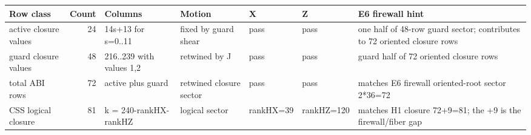 \begin{center}\small
\begin{tabular}{p{}r p{}p{}p{}p{}p{}}
\toprule
Row class & Count & Columns & Motion & X & Z & E6 firewall hint\\
\midrule
active closure values & 24 & 14s+13 for s=0..11 & fixed by guard shear & pass & pass & one half of 48-row guard sector; contributes to 72 oriented closure rows\\
guard closure values & 48 & 216..239 with values 1,2 & retwined by J & pass & pass & guard half of 72 oriented closure rows\\
total ABI rows & 72 & active plus guard & retwined closure sector & pass & pass & matches E6 firewall oriented-root sector 2*36=72\\
CSS logical closure & 81 & k = 240-rankHX-rankHZ & logical sector & rankHX=39 & rankHZ=120 & matches H1 closure 72+9=81; the +9 is the firewall/fiber gap\\
\bottomrule
\end{tabular}
\end{center}
